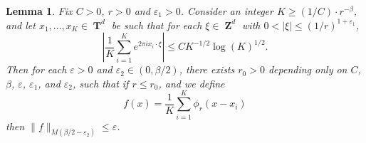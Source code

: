 \documentclass[12pt,reqno]{article}
\numberwithin{equation}{section}
\DeclareMathOperator{\ZZ}{\mathbf{Z}}
\DeclareMathOperator{\TT}{\mathbf{T}}
\newtheorem{lemma}{Lemma}
\begin{document}
\begin{comment}
\end{comment}

\begin{lemma} \label{Lemma65493}
    Fix $C > 0$, $r > 0$ and $\varepsilon_1 > 0$. Consider an integer $K \geq (1/C) \cdot r^{-\beta}$, and let $x_1,\dots,x_K \in \TT^d$ be such that for each $\xi \in \ZZ^d$ with $0 < |\xi| \leq (1/r)^{1 + \varepsilon_1}$,
    \begin{equation} \label{equationOIJDOIJIO}
        \left| \frac{1}{K} \sum_{i = 1}^K e^{2 \pi i x_i \cdot \xi} \right| \leq C K^{-1/2} \log(K)^{1/2}.
    \end{equation}
    Then for each $\varepsilon > 0$ and $\varepsilon_2 \in (0,\beta/2)$, there exists $r_0 > 0$ depending only on $C$, $\beta$, $\varepsilon$, $\varepsilon_1$, and $\varepsilon_2$, such that if $r \leq r_0$, and we define
    \[ f(x) = \frac{1}{K} \sum_{i = 1}^K \phi_r(x - x_i) \]
    then $\| f \|_{M(\beta/2 - \varepsilon_2)} \leq \varepsilon$.
\end{lemma}
\end{document}
